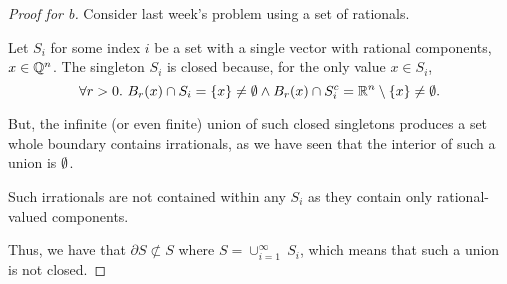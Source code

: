 \documentclass[../hw2]{subfiles}
\begin{document}
\begin{proof}[Proof for b]
	Consider last week's problem using a set of rationals.

	Let $S_i$ for some index $i$ be a set with a single vector with rational components, $x\in \mathbb{Q}^{n}$. The singleton $S_i$ is closed because, for the only value $x\in S_i$, \[
		\forall r>0.\ B_r(x)\cap S_i = \{x \} \neq \emptyset \land B_r(x)\cap S_i^c=\mathbb{R}^{n}\setminus \{x \} \neq\emptyset
		.\]

	But, the infinite (or even finite) union of such closed singletons produces a set whole boundary contains irrationals, as we have seen that the interior of such a union is $\emptyset$.

	Such irrationals are not contained within any $S_i$ as they contain only rational-valued components.

	Thus, we have that $\partial{S}\not\subset S$ where $S=\cup_{i=1}^{\infty}\ S_i$, which means that such a union is not closed.
\end{proof}
\end{document}
